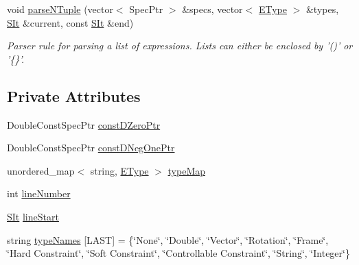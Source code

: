 \begin{DoxyCompactItemize}
void \hyperlink{classgiskard__suturo_1_1GiskardLangParser_aaf75a2f3a06d4770cc7b11f12d932fc0}{parse\-N\-Tuple} (vector$<$ Spec\-Ptr $>$ \&specs, vector$<$ \hyperlink{classgiskard__suturo_1_1GiskardLangParser_adbdbadf4ee4e2afb358b4ff98bf7daa2}{E\-Type} $>$ \&types, \hyperlink{classgiskard__suturo_1_1GiskardLangParser_aaebad1dc1afc92c7bdc1aa7e4d679621}{S\-It} \&current, const \hyperlink{classgiskard__suturo_1_1GiskardLangParser_aaebad1dc1afc92c7bdc1aa7e4d679621}{S\-It} \&end)
\begin{DoxyCompactList}\small\item\em Parser rule for parsing a list of expressions. Lists can either be enclosed by '()' or '\{\}'. \end{DoxyCompactList}\end{DoxyCompactItemize}
\subsection*{Private Attributes}
\begin{DoxyCompactItemize}
\item 
Double\-Const\-Spec\-Ptr \hyperlink{classgiskard__suturo_1_1GiskardLangParser_a2cbca21a0af921f28ec5af80b8f233ea}{const\-D\-Zero\-Ptr}
\item 
Double\-Const\-Spec\-Ptr \hyperlink{classgiskard__suturo_1_1GiskardLangParser_af82a7613902dec8003b2f95e3607e203}{const\-D\-Neg\-One\-Ptr}
\item 
unordered\-\_\-map$<$ string, \hyperlink{classgiskard__suturo_1_1GiskardLangParser_adbdbadf4ee4e2afb358b4ff98bf7daa2}{E\-Type} $>$ \hyperlink{classgiskard__suturo_1_1GiskardLangParser_a29f9aebbf699d791e7aa2bb8a2801e55}{type\-Map}
\item 
int \hyperlink{classgiskard__suturo_1_1GiskardLangParser_a80c8068fe1360e40e27677709768fe1c}{line\-Number}
\item 
\hyperlink{classgiskard__suturo_1_1GiskardLangParser_aaebad1dc1afc92c7bdc1aa7e4d679621}{S\-It} \hyperlink{classgiskard__suturo_1_1GiskardLangParser_aee2f868fa5e5ba08ad9f991075930b91}{line\-Start}
\item 
string \hyperlink{classgiskard__suturo_1_1GiskardLangParser_ae67fc056dcafc91683096d0cc4a0f031}{type\-Names} \mbox{[}L\-A\-S\-T\mbox{]} = \{\char`\"{}None\char`\"{}, \char`\"{}Double\char`\"{}, \char`\"{}Vector\char`\"{}, \char`\"{}Rotation\char`\"{}, \char`\"{}Frame\char`\"{}, \char`\"{}Hard Constraint\char`\"{}, \char`\"{}Soft Constraint\char`\"{}, \char`\"{}Controllable Constraint\char`\"{}, \char`\"{}String\char`\"{}, \char`\"{}Integer\char`\"{}\}
\end{DoxyCompactItemize}


